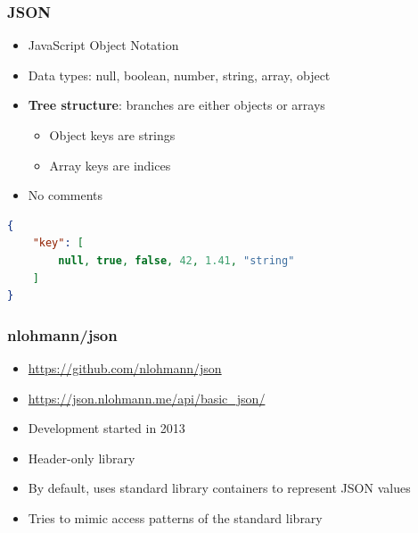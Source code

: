 \begin{frame}[fragile]\frametitle{JSON}
  \begin{itemize}
    \item JavaScript Object Notation
    \item Data types:
      null, boolean, number, string, array, object
    \item {\bfseries Tree structure}: branches are either objects or arrays
      \begin{itemize}
        \item Object keys are strings
        \item Array keys are indices
      \end{itemize}
    \item No comments
  \end{itemize}
\begin{lstlisting}[language=json]
{
    "key": [
        null, true, false, 42, 1.41, "string"
    ]
}
\end{lstlisting}
\end{frame}

\begin{frame}[fragile]
\frametitle{\texorpdfstring{\ttfamily nlohmann/json}{nlohmann/json}}
  \begin{itemize}
    \item {\footnotesize\url{https://github.com/nlohmann/json}}
    \item {\footnotesize\url{https://json.nlohmann.me/api/basic_json/}}
    \item Development started in 2013
    \item Header-only library
    \item By default, uses standard library containers to represent JSON values
    \item Tries to mimic access patterns of the standard library
  \end{itemize}
\end{frame}

